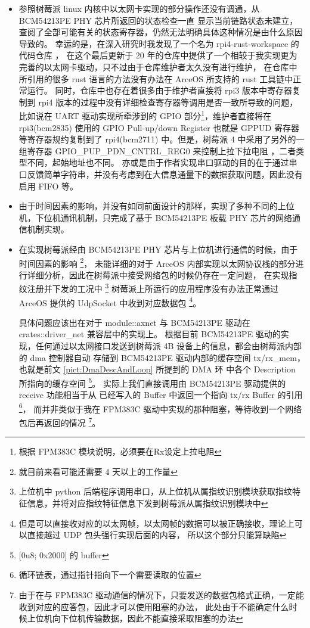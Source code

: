     \begin{itemize}
        \item 参照树莓派 linux 内核中以太网卡实现的部分操作还没有调通，从 BCM54213PE PHY 芯片所返回的状态检查一直
        显示当前链路状态未建立，查阅了全部可能有关的状态寄存器，仍然无法明确具体这种情况是由什么原因导致的。
        幸运的是，在深入研究时我发现了一个名为 rpi4-rust-workspace 的代码仓库 \cite{rpi4-rust-workspace}，
        在这个最后更新于 20 年的仓库中提供了一个相较于我实现更为完善的以太网卡驱动，只不过由于仓库维护者太久没有进行维护，
        在仓库中所引用的很多 rust 语言的方法没有办法在 ArceOS 所支持的 rust 工具链中正常运行。
        同时，仓库中也存在着很多由于维护者直接将 rpi3 版本中寄存器复制到 rpi4 版本的过程中没有详细检查寄存器等调用是否一致所导致的问题，
        比如说在 UART 驱动实现所牵涉到的 GPIO 部分\footnote{根据 FPM383C 模块说明，必须要在Rx设定上拉电阻}，维护者直接将在
        rpi3(bcm2835) 使用的 GPIO Pull-up/down Register 也就是 GPPUD 寄存器等寄存器规约复制到了 rpi4(bcm2711)
        中\cite{raspberry-pi-bcm2835}。但是，树莓派 4 中采用了另外的一组寄存器 GPIO\_PUP\_PDN\_CNTRL\_REG0 来控制上拉下拉电阻
        \cite{raspberry-pi-bcm2711}，二者类型不同，起始地址也不同。
        亦或是由于作者实现串口驱动的目的在于通过串口反馈简单字符串，并没有考虑到在大信息通量下的数据获取问题，因此没有启用 FIFO 等。
        \item 由于时间因素的影响，并没有如同前面设计的那样，实现了多种不同的上位机，下位机通讯机制，只完成了基于 BCM54213PE 板载
        PHY 芯片的网络通信机制实现。
        \item 在实现树莓派经由 BCM54213PE PHY 芯片与上位机进行通信的时候，由于时间因素的影响
        \footnote{就目前来看可能还需要 4 天以上的工作量}，
        未能详细的对于 ArceOS 内部实现以太网协议栈的部分进行详细分析，因此在树莓派中接受网络包的时候仍存在一定问题，
        在实现指纹注册并下发的工况中
        \footnote{上位机中 python 后端程序调用串口，从上位机从属指纹识别模块获取指纹特征信息，并将对应指纹特征信息下发到树莓派从属指纹识别模块中}
        树莓派上所运行的应用程序没有办法正常通过 ArceOS 提供的 UdpSocket 中收到对应数据包
        \footnote{但是可以直接收对应的以太网帧，以太网帧的数据可以被正确接收，理论上可以直接越过 UDP 包头强行实现后面的内容，
        所以这个部分只能算缺陷}。

        具体问题应该出在对于 module::axnet 与 BCM54213PE 驱动在 crates::driver\_net 兼容层中的实现上。
        根据目前 BCM54213PE 驱动的实现，任何通过以太网接口发送到树莓派 4B 设备上的信息，都会由树莓派内部的 dma 控制器自动
        存储到 BCM54213PE 驱动内部的缓存空间 tx/rx\_mem，也就是前文 \ref{pict:DmaDescAndLoop} 所提到的 DMA 环
        中各个 Description 所指向的缓存空间 \footnote{[0u8; 0x2000] 的 buffer}。
        实际上我们直接调用由 BCM54213PE 驱动提供的 receive 功能相当于从
        已经写入的 Buffer 中返回一个指向 tx/rx Buffer 的引用\footnote{循环链表，通过指针指向下一个需要读取的位置}，
        而并非类似于我在 FPM383C 驱动中实现的那种阻塞，等待收到一个网络包后再返回的情况
        \footnote{由于在与 FPM383C 驱动通信的情况下，只要发送的数据包格式正确，一定能收到对应的应答包，因此才可以使用阻塞的办法，
        此处由于不能确定什么时候上位机向下位机传输数据，因此不能直接采取阻塞的办法}。


\end{itemize}
